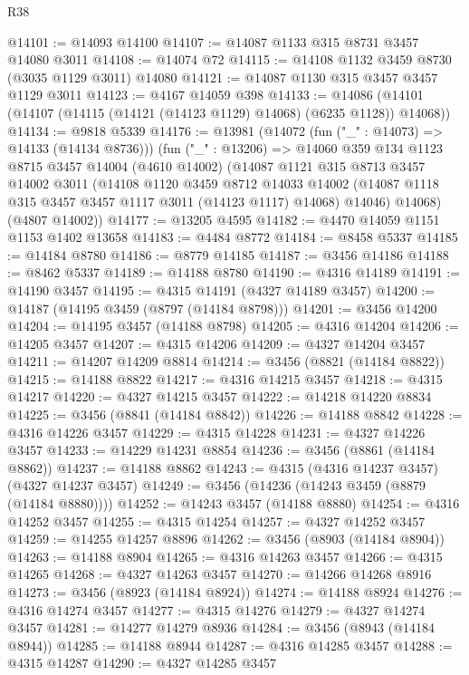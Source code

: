 \begin{lexlean}{R38}
\begin{coremodule}
@14101 := @14093 @14100
@14107 := @14087 @1133 @315 @8731 @3457 @14080 @3011
@14108 := @14074 @72
@14115 := @14108 @1132 @3459 @8730 (@3035 @1129 @3011) @14080
@14121 := @14087 @1130 @315 @3457 @3457 @1129 @3011
@14123 := @4167 @14059 @398
@14133 := @14086 (@14101 (@14107 (@14115 (@14121 (@14123 @1129) @14068) (@6235 @1128)) @14068))
@14134 := @9818 @5339
@14176 := @13981
    (@14072 (fun ("_" : @14073) => @14133 (@14134 @8736)))
    (fun ("_" : @13206) =>
    @14060
      @359
      @134
      @1123
      @8715
      @3457
      @14004
      (@4610 @14002)
      (@14087
        @1121
        @315
        @8713
        @3457
        @14002
        @3011
        (@14108
          @1120
          @3459
          @8712
          @14033
          @14002
          (@14087 @1118 @315 @3457 @3457 @1117 @3011 (@14123 @1117) @14068)
          @14046)
        @14068)
      (@4807 @14002))
@14177 := @13205 @4595
@14182 := @4470 @14059 @1151 @1153 @1402 @13658
@14183 := @4484 @8772
@14184 := @8458 @5337
@14185 := @14184 @8780
@14186 := @8779 @14185
@14187 := @3456 @14186
@14188 := @8462 @5337
@14189 := @14188 @8780
@14190 := @4316 @14189
@14191 := @14190 @3457
@14195 := @4315 @14191 (@4327 @14189 @3457)
@14200 := @14187 (@14195 @3459 (@8797 (@14184 @8798)))
@14201 := @3456 @14200
@14204 := @14195 @3457 (@14188 @8798)
@14205 := @4316 @14204
@14206 := @14205 @3457
@14207 := @4315 @14206
@14209 := @4327 @14204 @3457
@14211 := @14207 @14209 @8814
@14214 := @3456 (@8821 (@14184 @8822))
@14215 := @14188 @8822
@14217 := @4316 @14215 @3457
@14218 := @4315 @14217
@14220 := @4327 @14215 @3457
@14222 := @14218 @14220 @8834
@14225 := @3456 (@8841 (@14184 @8842))
@14226 := @14188 @8842
@14228 := @4316 @14226 @3457
@14229 := @4315 @14228
@14231 := @4327 @14226 @3457
@14233 := @14229 @14231 @8854
@14236 := @3456 (@8861 (@14184 @8862))
@14237 := @14188 @8862
@14243 := @4315 (@4316 @14237 @3457) (@4327 @14237 @3457)
@14249 := @3456 (@14236 (@14243 @3459 (@8879 (@14184 @8880))))
@14252 := @14243 @3457 (@14188 @8880)
@14254 := @4316 @14252 @3457
@14255 := @4315 @14254
@14257 := @4327 @14252 @3457
@14259 := @14255 @14257 @8896
@14262 := @3456 (@8903 (@14184 @8904))
@14263 := @14188 @8904
@14265 := @4316 @14263 @3457
@14266 := @4315 @14265
@14268 := @4327 @14263 @3457
@14270 := @14266 @14268 @8916
@14273 := @3456 (@8923 (@14184 @8924))
@14274 := @14188 @8924
@14276 := @4316 @14274 @3457
@14277 := @4315 @14276
@14279 := @4327 @14274 @3457
@14281 := @14277 @14279 @8936
@14284 := @3456 (@8943 (@14184 @8944))
@14285 := @14188 @8944
@14287 := @4316 @14285 @3457
@14288 := @4315 @14287
@14290 := @4327 @14285 @3457

\end{coremodule}
\end{lexlean}
